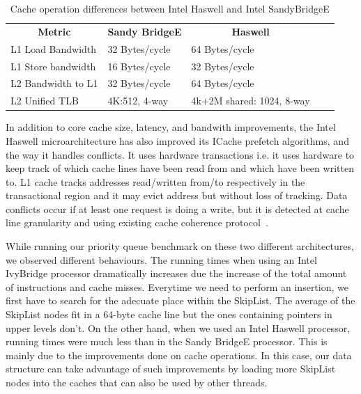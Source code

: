 \begin{table}[ht]
\footnotesize
\begin{tabular}{|l|l|l|ll}
\cline{1-3}
\multicolumn{1}{|c|}{\textbf{Metric}} & \multicolumn{1}{c|}{\textbf{Sandy BridgeE}} & \multicolumn{1}{c|}{\textbf{Haswell}} &  &  \\ \cline{1-3}
L1 Load Bandwidth                     & 32 Bytes/cycle                           & 64 Bytes/cycle                        &  &  \\ \cline{1-3}
L1 Store bandwidth                    & 16 Bytes/cycle                           & 32 Bytes/cycle                        &  &  \\ \cline{1-3}
L2 Bandwidth to L1                    & 32 Bytes/cycle                           & 64 Bytes/cycle                        &  &  \\ \cline{1-3}
L2 Unified TLB                        & 4K:512, 4-way                            & 4k+2M shared: 1024, 8-way             &  &  \\ \cline{1-3}
\end{tabular}
\caption{Cache operation differences between Intel Haswell and Intel SandyBridgeE}
\label{tab:haswell_ivy}
\end{table}

In addition to core cache size, latency, and bandwith improvements, the Intel Haswell microarchitecture has also improved its ICache prefetch algorithms, and the way it handles conflicts. It uses hardware transactions i.e. it uses hardware to keep track of which cache lines have been read from and which have been written to. L1 cache tracks addresses read/written from/to respectively in the transactional region and it may evict address but without loss of tracking. Data conflicts occur if at least one request is doing a write, but it is detected at cache line granularity and using existing cache coherence protocol~\cite{rajwar_qconsf2012,dk_haswell}.

While running our priority queue benchmark on these two different architectures, we observed different behaviours. The running times when using an Intel IvyBridge processor dramatically increases due the increase of the total amount of instructions and cache misses. Everytime we need to perform an insertion, we first have to search for the adecuate place within the SkipList. The average of the SkipList nodes fit in a 64-byte cache line but the ones containing pointers in upper levels don't. On the other hand, when we used an Intel Haswell processor, running times were much less than in the Sandy BridgeE processor. This is mainly due to the improvements done on cache operations. In this case, our data structure can take advantage of such improvements by loading more SkipList nodes into the caches that can also be used by other threads.

